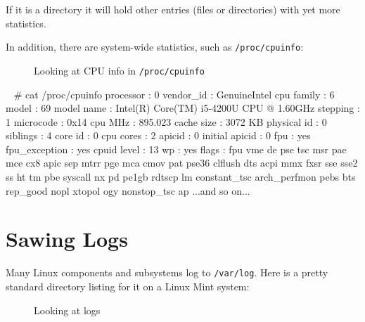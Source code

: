 \documentclass[10pt,american,]{book}
\newenvironment{Shaded}{\begin{snugshade}}{\end{snugshade}}
\newcommand{\KeywordTok}[1]{\textcolor[rgb]{0.13,0.29,0.53}{\textbf{{#1}}}}
\newcommand{\CommentTok}[1]{\textcolor[rgb]{0.56,0.35,0.01}{\textit{{#1}}}}
\newcommand{\NormalTok}[1]{{#1}}
\numberwithin{figure}{chapter}
\DeclareRobustCommand{\drcap}[1]{\begin{figure}[H]\caption{#1}\end{figure}}
\renewcommand{\KeywordTok}[1]{{#1}}
\renewcommand{\CommentTok}[1]{{#1}}
\renewcommand{\NormalTok}[1]{{#1}}
\begin{document}
If it is a directory it will hold other entries (files or directories)
with yet more statistics.

In addition, there are system-wide statistics, such as
\texttt{/proc/cpuinfo}:

\drcap{Looking at CPU info in \texttt{/proc/cpuinfo}}

\begin{Shaded}
\begin{Highlighting}[]
\KeywordTok{~} \CommentTok{# cat /proc/cpuinfo }
\KeywordTok{processor}   \NormalTok{: 0}
\KeywordTok{vendor_id}   \NormalTok{: GenuineIntel}
\KeywordTok{cpu} \NormalTok{family  : 6}
\KeywordTok{model}       \NormalTok{: 69}
\KeywordTok{model} \NormalTok{name  : Intel(R) }\KeywordTok{Core}\NormalTok{(TM) }\KeywordTok{i5-4200U} \NormalTok{CPU @ 1.60GHz}
\KeywordTok{stepping}    \NormalTok{: 1}
\KeywordTok{microcode}   \NormalTok{: 0x14}
\KeywordTok{cpu} \NormalTok{MHz     : 895.023}
\KeywordTok{cache} \NormalTok{size  : 3072 KB}
\KeywordTok{physical} \NormalTok{id : 0}
\KeywordTok{siblings}    \NormalTok{: 4}
\KeywordTok{core} \NormalTok{id     : 0}
\KeywordTok{cpu} \NormalTok{cores   : 2}
\KeywordTok{apicid}      \NormalTok{: 0}
\KeywordTok{initial} \NormalTok{apicid  : 0}
\KeywordTok{fpu}     \NormalTok{: yes}
\KeywordTok{fpu_exception}   \NormalTok{: yes}
\KeywordTok{cpuid} \NormalTok{level : 13}
\KeywordTok{wp}      \NormalTok{: yes}
\KeywordTok{flags}       \NormalTok{: fpu vme de pse tsc msr pae mce cx8 apic sep mtrr pge mca cmov }
\KeywordTok{pat} \NormalTok{pse36 clflush dts acpi mmx fxsr sse sse2 ss ht tm pbe syscall nx pd}
\KeywordTok{pe1gb} \NormalTok{rdtscp lm constant_tsc arch_perfmon pebs bts rep_good nopl xtopol}
\KeywordTok{ogy} \NormalTok{nonstop_tsc ap}
\KeywordTok{...and} \NormalTok{so on...}
\end{Highlighting}
\end{Shaded}

\section*{Sawing Logs}\label{sawing-logs}

Many Linux components and subsystems log to \texttt{/var/log}.
 Here is
a pretty standard directory listing for it on a Linux Mint system:

\drcap{Looking at logs}
\end{document}
